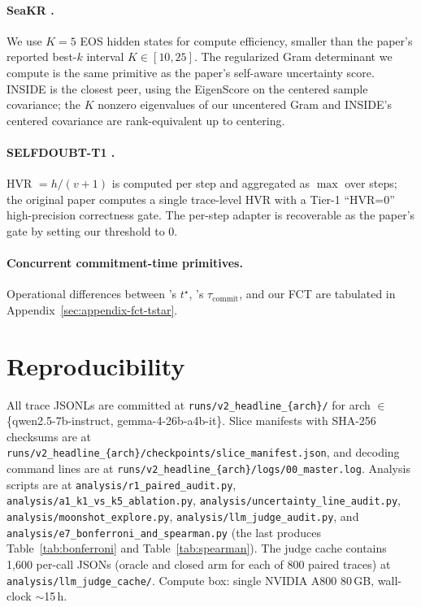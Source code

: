 \documentclass[11pt]{article}
\begin{document}
\paragraph{SeaKR \citep{yao_seakr_nodate}.} We use $K{=}5$ EOS hidden states for compute efficiency, smaller than the paper's reported best-$k$ interval $K \in [10, 25]$. The regularized Gram determinant we compute is the same primitive as the paper's self-aware uncertainty score. INSIDE \citep{chen_inside_2024} is the closest peer, using the EigenScore on the centered sample covariance; the $K$ nonzero eigenvalues of our uncentered Gram and INSIDE's centered covariance are rank-equivalent up to centering.

\paragraph{SELFDOUBT-T1 \citep{pandey_selfdoubt_2026}.} HVR $= h/(v+1)$ is computed per step and aggregated as $\max$ over steps; the original paper computes a single trace-level HVR with a Tier-1 ``HVR=0'' high-precision correctness gate. The per-step adapter is recoverable as the paper's gate by setting our threshold to $0$.

\paragraph{Concurrent commitment-time primitives.} Operational differences between \citet{datta_large_2026}'s $t^\star$, \citet{zhang_commit_2026}'s $\tau_{\text{commit}}$, and our FCT are tabulated in Appendix~\ref{sec:appendix-fct-tstar}.

\section{Reproducibility}
\label{sec:appendix-repro}

All trace JSONLs are committed at \texttt{runs/v2\_headline\_\{arch\}/} for arch $\in$ \{qwen2.5-7b-instruct, gemma-4-26b-a4b-it\}. Slice manifests with SHA-256 checksums are at \texttt{runs/v2\_headline\_\{arch\}/checkpoints/slice\_manifest.json}, and decoding command lines are at \texttt{runs/v2\_headline\_\{arch\}/logs/00\_master.log}. Analysis scripts are at \texttt{analysis/r1\_paired\_audit.py}, \texttt{analysis/a1\_k1\_vs\_k5\_ablation.py}, \texttt{analysis/uncertainty\_line\_audit.py}, \texttt{analysis/moonshot\_explore.py}, \texttt{analysis/llm\_judge\_audit.py}, and \texttt{analysis/e7\_bonferroni\_and\_spearman.py} (the last produces Table~\ref{tab:bonferroni} and Table~\ref{tab:spearman}). The judge cache contains 1{,}600 per-call JSONs (oracle and closed arm for each of 800 paired traces) at \texttt{analysis/llm\_judge\_cache/}. Compute box: single NVIDIA A800 80\,GB, wall-clock $\sim$15\,h.
\end{document}

